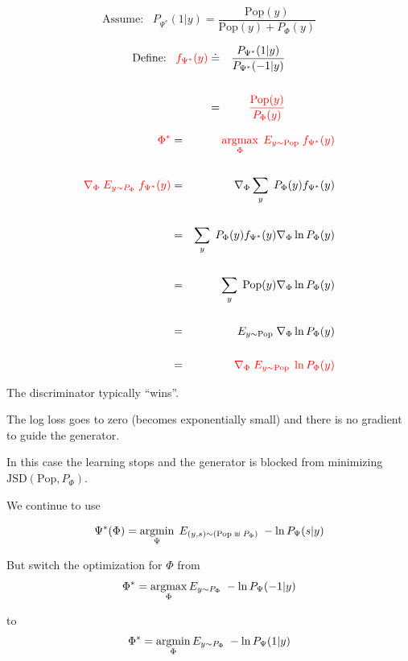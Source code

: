 {\vfill
$$\mbox{Assume:}\;\;\; P_{\Psi^*}(1|y) = \frac{\mathrm{Pop}(y)}{\mathrm{Pop}(y) + P_\Phi(y)}$$

\vfill
\begin{eqnarray*}
  \mbox{Define:}\;\;\; {\color{red} f_{\Psi^*}(y)} & \doteq & \frac{P_{\Psi^*}(1|y)}{P_{\Psi^*}(-1|y)} \\
\\
& = & {\color{red} \frac{\mathrm{Pop}(y)}{P_\Phi(y)}}
\end{eqnarray*}


{\huge
\begin{eqnarray*}
 {\color{red} \Phi^*}& = & {\color{red} \operatorname*{argmax}_\Phi\;E_{y \sim \mathrm{Pop}} \;f_{\Psi^*}(y)} \\
 \\
 {\color{red} \nabla_\Phi \; E_{y \sim P_\Phi}\;  f_{\Psi^*}(y)}  & = & \nabla _\Phi \sum_y\; P_\Phi(y) f_{\Psi^*}(y) \\
  \\
  & = & \sum_y \; P_\Phi(y) f_{\Psi^*}(y) \nabla_\Phi \ln P_\Phi(y) \\
  \\
  & = & \sum_y \;\mathrm{Pop}(y) \nabla_\Phi \ln P_\Phi(y) \\
  \\
  & = & E_{y \sim \mathrm{Pop}} \; \nabla_\Phi \ln P_\Phi(y) \\
  \\
  & = & {\color{red} \nabla_\Phi \; E_{y \sim \mathrm{Pop}} \;\ln P_\Phi(y)}
\end{eqnarray*}
}


The discriminator typically ``wins''.

\vfill
The log loss goes to zero (becomes exponentially small) and there is no gradient to guide the generator.

\vfill
In this case the learning stops and the generator is blocked from minimizing $\mathrm{JSD}(\mathrm{Pop},P_\Phi)$.


We continue to use

$$\Psi^*(\Phi) = \operatorname*{argmin}_\Psi \;E_{(y,s) \sim (\mathrm{Pop}\; \uplus \;P_\Phi)}\;- \ln P_\Psi(s|y)$$

\vfill
But switch the optimization for $\Phi$ from
$$\Phi^* = \operatorname*{argmax}_\Phi E_{y \sim P_\Phi}\; - \ln P_\Psi(-1|y)$$

to
$$\Phi^* = \operatorname*{argmin}_\Phi E_{y \sim P_\Phi}\;- \ln P_\Psi(1|y)$$

}
